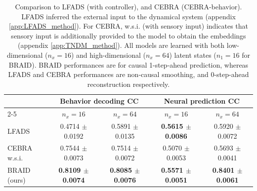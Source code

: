 \documentclass{article} %
\newcommand{\ourmethod}{BRAID}
\begin{document}
\begin{table}[t]
\caption{Comparison to LFADS (with controller), and CEBRA (CEBRA-behavior). LFADS inferred the external input to the dynamical system (appendix \ref{app:LFADS_method}). For CEBRA, w.s.i. (with sensory input) indicates that sensory input is additionally provided to the model to obtain the embeddings (appendix \ref{app:TNDM_method}). All models are learned with both low-dimensional ($n_x\!=\!16$) and high-dimensional ($n_x\!=\!64$) latent states ($n_1\!=\!16$ for \ourmethod{}). \ourmethod{} performances are for causal 1-step-ahead prediction, whereas LFADS and CEBRA performances are non-causal smoothing, and 0-step-ahead reconstruction respectively.}
\label{tab: LFADS_CEBRA_comparison}
\begin{center}
\begin{tabular}{l|c|c|c|c}
\renewcommand{\arraystretch}{5}
\multirow{2}{*}{\textbf{Method}} & \multicolumn{2}{c|}{\textbf{Behavior decoding CC}} & \multicolumn{2}{c}{\textbf{Neural prediction CC}} \\ \cline{2-5} & $n_x=16$ & $n_x=64$ & $n_x=16$ & $n_x=64$ \\
\midrule
LFADS & 0.4714 \(\pm\) 0.0192 & 0.5891 \(\pm\) 0.0135 & \textbf{0.5615 \(\pm\) 0.0086} & 0.5920 \(\pm\) 0.0072 \\
CEBRA w.s.i. & 0.7544 \(\pm\) 0.0073 & 0.7514 \(\pm\) 0.0072 &  0.5070 \(\pm\) 0.0053 & 0.5693 \(\pm\) 0.0041 \\
\midrule
\ourmethod{} (ours) & \textbf{0.8109 \(\pm\) 0.0074} & \textbf{0.8085 \(\pm\) 0.0076} & \textbf{0.5571 \(\pm\)  0.0051} & \textbf{0.8401 \(\pm\) 0.0061} \\
\end{tabular}
\end{center}
\end{table}
\end{document}

